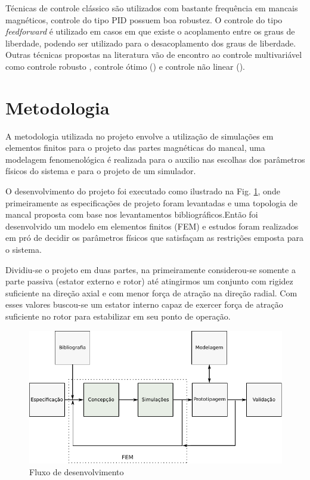 Técnicas de controle clássico são utilizados com bastante frequência em mancais magnéticos, controle do tipo PID  \citep{Tezuka2013} possuem boa robustez. O controle  do tipo \textit{feedforward} é utilizado em casos em que existe o acoplamento entre os graus de liberdade, podendo ser utilizado para o desacoplamento dos graus de liberdade. Outras técnicas propostas na literatura vão de encontro ao controle multivariável como controle robusto \citep{Jimenez-Lizafrraga2007}, controle ótimo (\citep{Schuhmann2012}) e controle não linear (\citep{Rundell1996}).

\section{Metodologia}

A metodologia utilizada no projeto envolve a utilização de simulações em elementos finitos para o projeto das partes magnéticas do mancal, uma modelagem fenomenológica é realizada para o auxilio nas escolhas dos parâmetros físicos do sistema e para o projeto de um simulador.

O desenvolvimento do projeto foi executado como ilustrado na Fig. \ref{fig:metodologia:fluxo:dev}, onde primeiramente as especificações de projeto foram levantadas e uma topologia de mancal proposta com base nos levantamentos bibliográficos.Então foi desenvolvido um modelo em elementos finitos (FEM) e estudos foram realizados em pró de decidir os parâmetros físicos que satisfaçam as restrições emposta para o sistema.

Dividiu-se o projeto em duas partes, na primeiramente considerou-se somente a parte passiva (estator externo e rotor) até atingirmos um conjunto com rigidez suficiente na direção axial e com menor força de atração na direção radial. Com esses valores buscou-se um estator interno capaz de exercer força de atração suficiente no rotor para estabilizar em seu ponto de operação.

 
\begin{figure}[th!]
	\centering
	\includegraphics[width=1\linewidth]{Figs/metodologia_fluxo_dev}
	\caption{Fluxo de desenvolvimento}
	\label{fig:metodologia:fluxo:dev}
\end{figure}
 
